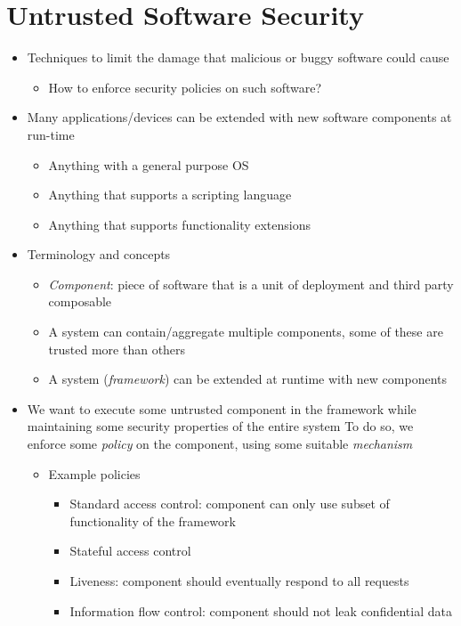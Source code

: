 \documentclass[12pt,titlepage,a4paper]{report}
\begin{document}
	\chapter{Untrusted Software Security}
	\begin{itemize}
		\item[\textrightarrow] Techniques to limit the damage that malicious or buggy software could cause
		\begin{itemize}
			\item How to enforce security policies on such software?
		\end{itemize}
		\item Many applications/devices can be extended with new software components at run-time
		\begin{itemize}
			\item Anything with a general purpose OS
			\item Anything that supports a scripting language
			\item Anything that supports functionality extensions
		\end{itemize}
		\item Terminology and concepts
		\begin{itemize}
			\item \textit{Component}: piece of software that is a unit of deployment and third party composable
			\item A system can contain/aggregate multiple components, some of these are trusted more than others
			\item A system (\textit{framework}) can be extended at runtime with new components
		\end{itemize}
		\item We want to execute some untrusted component in the framework while maintaining some security properties of the entire system
		\subitem To do so, we enforce some \emph{policy} on the component, using some suitable \emph{mechanism}
		\begin{itemize}
			\item Example policies
			\begin{itemize}
				\item Standard access control: component can only use subset of functionality of the framework
				\item Stateful access control
				\item Liveness: component should eventually respond to all requests
				\item Information flow control: component should not leak confidential data

\end{itemize}
\end{itemize}
\end{itemize}
\end{document}
